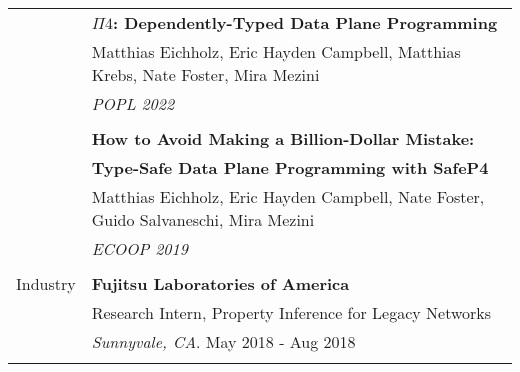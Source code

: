 \documentclass[letterpaper,10pt,oneside]{article}
\begin{document}
\begin{tabular}{@{} l l}
  & \textbf{$\Pi4$: Dependently-Typed Data Plane Programming} \\
  & Matthias Eichholz, Eric Hayden Campbell, Matthias Krebs, Nate Foster, Mira Mezini \\
  & \textit{POPL 2022}\\ & \\

  & \textbf{How to Avoid Making a Billion-Dollar Mistake:}\\
  & \textbf{Type-Safe Data Plane Programming with SafeP4} \\
  & Matthias Eichholz, Eric Hayden Campbell, Nate Foster, Guido Salvaneschi, Mira Mezini \\
  & \textit{ECOOP 2019} \\
  & \\

 \Large{Industry}
  & \textbf{Fujitsu Laboratories of America} \\
  & Research Intern, Property Inference for Legacy Networks \\
  & \textit{Sunnyvale, CA}. May 2018 - Aug 2018 \\
  & \\

\end{tabular}
\end{document}
